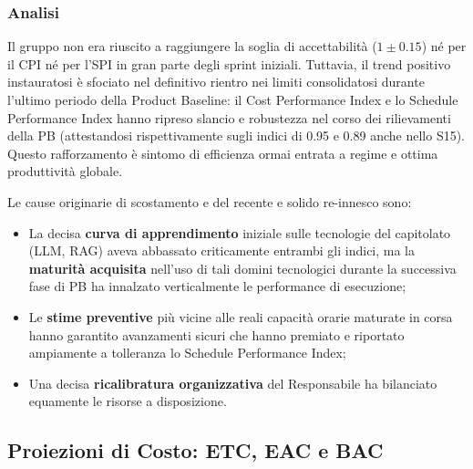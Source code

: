 \documentclass[a4paper,11pt,oneside]{scrartcl}
\begin{document}
\subsubsection*{Analisi}

Il gruppo non era riuscito a raggiungere la soglia di accettabilità ($1 \pm 0.15$) né per il CPI né per l'SPI in gran parte degli sprint iniziali. Tuttavia, il trend positivo instauratosi è sfociato nel definitivo rientro nei limiti consolidatosi durante l'ultimo periodo della Product Baseline: il Cost Performance Index e lo Schedule Performance Index hanno ripreso slancio e robustezza nel corso dei rilievamenti della PB (attestandosi rispettivamente sugli indici di 0.95 e 0.89 anche nello S15). Questo rafforzamento è sintomo di efficienza ormai entrata a regime e ottima produttività globale.

Le cause originarie di scostamento e del recente e solido re-innesco sono:
\begin{itemize}
    \item La decisa \textbf{curva di apprendimento} iniziale sulle tecnologie del capitolato (LLM{\scriptsize{}}, RAG{\scriptsize{}}) aveva abbassato criticamente entrambi gli indici, ma la \textbf{maturità acquisita} nell'uso di tali domini tecnologici durante la successiva fase di PB ha innalzato verticalmente le performance di esecuzione;
    \item Le \textbf{stime preventive} più vicine alle reali capacità orarie maturate in corsa hanno garantito avanzamenti sicuri che hanno premiato e riportato ampiamente a tolleranza lo Schedule Performance Index;
    \item Una decisa \textbf{ricalibratura organizzativa} del Responsabile ha bilanciato equamente le risorse a disposizione.
\end{itemize}

\subsection{Proiezioni di Costo: ETC, EAC e BAC}
\end{document}
